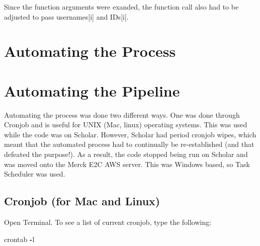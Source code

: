 \documentclass[]{book}
\newenvironment{Shaded}{\begin{snugshade}}{\end{snugshade}}
\newcommand{\BuiltInTok}[1]{#1}
\newcommand{\CommentTok}[1]{\textcolor[rgb]{0.56,0.35,0.01}{\textit{#1}}}
\newcommand{\ControlFlowTok}[1]{\textcolor[rgb]{0.13,0.29,0.53}{\textbf{#1}}}
\newcommand{\DecValTok}[1]{\textcolor[rgb]{0.00,0.00,0.81}{#1}}
\newcommand{\KeywordTok}[1]{\textcolor[rgb]{0.13,0.29,0.53}{\textbf{#1}}}
\newcommand{\NormalTok}[1]{#1}
\newcommand{\OperatorTok}[1]{\textcolor[rgb]{0.81,0.36,0.00}{\textbf{#1}}}
\newcommand{\SpecialCharTok}[1]{\textcolor[rgb]{0.00,0.00,0.00}{#1}}
\newcommand{\StringTok}[1]{\textcolor[rgb]{0.31,0.60,0.02}{#1}}
\begin{document}
Since the function arguments were exanded, the function call also had to be adjusted to pass usernames{[}i{]} and IDs{[}i{]}.

\begin{Shaded}
\end{Shaded}

\hypertarget{automating-the-process}{%
\section{Automating the Process}\label{automating-the-process}}

\hypertarget{automating-the-pipeline}{%
\section{Automating the Pipeline}\label{automating-the-pipeline}}

Automating the process was done two different ways. One was done through Cronjob and is useful for UNIX (Mac, linux) operating systems. This was used while the code was on Scholar. However, Scholar had period cronjob wipes, which meant that the automated process had to continually be re-established (and that defeated the purpose!). As a result, the code stopped being run on Scholar and was moved onto the Merck E2C AWS server. This was Windows based, so Task Scheduler was used.

\hypertarget{cronjob-for-mac-and-linux}{%
\subsection{Cronjob (for Mac and Linux)}\label{cronjob-for-mac-and-linux}}

Open Terminal. To see a list of current cronjob, type the following:

\begin{Shaded}
\begin{Highlighting}[]
\NormalTok{crontab }\OperatorTok{-}\NormalTok{l}
\end{Highlighting}
\end{Shaded}
\end{document}
